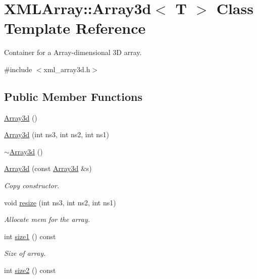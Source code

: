 \hypertarget{classXMLArray_1_1Array3d}{}\section{X\+M\+L\+Array\+:\+:Array3d$<$ T $>$ Class Template Reference}
\label{classXMLArray_1_1Array3d}


Container for a Array-\/dimensional 3D array.  




{\ttfamily \#include $<$xml\+\_\+array3d.\+h$>$}

\subsection*{Public Member Functions}
\begin{DoxyCompactItemize}
\item 
\mbox{\hyperlink{classXMLArray_1_1Array3d_a05f33dbf6ca20ca7a16ec3e6d74f272b}{Array3d}} ()
\item 
\mbox{\hyperlink{classXMLArray_1_1Array3d_ae97f5fabfb023196e45ab6fd53d533d9}{Array3d}} (int ns3, int ns2, int ns1)
\item 
\mbox{\hyperlink{classXMLArray_1_1Array3d_a8ad71a50d673f74c88d605214a4acbd7}{$\sim$\+Array3d}} ()
\item 
\mbox{\hyperlink{classXMLArray_1_1Array3d_ab537a98b1435f3201b099ace57ab15bd}{Array3d}} (const \mbox{\hyperlink{classXMLArray_1_1Array3d}{Array3d}} \&s)
\begin{DoxyCompactList}\small\item\em Copy constructor. \end{DoxyCompactList}\item 
void \mbox{\hyperlink{classXMLArray_1_1Array3d_afe27b06ef40efdd87dbea00eafa35287}{resize}} (int ns3, int ns2, int ns1)
\begin{DoxyCompactList}\small\item\em Allocate mem for the array. \end{DoxyCompactList}\item 
int \mbox{\hyperlink{classXMLArray_1_1Array3d_aa084cbb2756e62556c9ec4c4cb971bf0}{size1}} () const
\begin{DoxyCompactList}\small\item\em Size of array. \end{DoxyCompactList}\item 
int \mbox{\hyperlink{classXMLArray_1_1Array3d_a1ea00a28e916b3fd9102ce7057c02dac}{size2}} () const
\item 

\end{DoxyCompactItemize}
